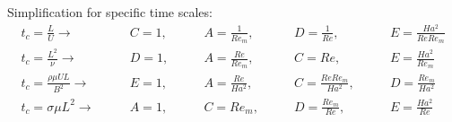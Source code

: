 \documentclass[11pt]{article}
\begin{document}
Simplification for specific time scales:
\begin{equation}\begin{aligned}
	t_c = \frac{L}{U}              \rightarrow \qquad & C = 1, \qquad & A = \frac{1}{Re_m},    \qquad & D = \frac{1}{Re},         \qquad & E = \frac{Ha^2}{Re Re_m} \\
	t_c = \frac{L^2}{\nu}          \rightarrow \qquad & D = 1, \qquad & A = \frac{Re}{Re_m},   \qquad & C = Re,                   \qquad & E = \frac{Ha^2}{Re_m} \\
	t_c = \frac{\rho \mu U L}{B^2} \rightarrow \qquad & E = 1, \qquad & A = \frac{Re}{Ha^2},   \qquad & C = \frac{Re Re_m}{Ha^2}, \qquad & D = \frac{Re_m}{Ha^2} \\
	t_c = \sigma \mu L^2           \rightarrow \qquad & A = 1, \qquad & C = Re_m,              \qquad & D = \frac{Re_m}{Re},      \qquad & E = \frac{Ha^2}{Re} \\
\end{aligned} \end{equation}
\end{document}
